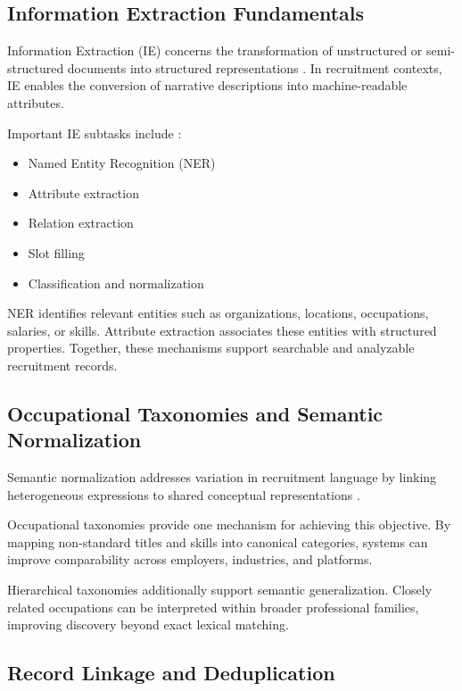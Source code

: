 \subsection{Information Extraction Fundamentals}

Information Extraction (IE) concerns the transformation of unstructured or semi-structured documents into structured representations \cite{jurafsky2023speech}. In recruitment contexts, IE enables the conversion of narrative descriptions into machine-readable attributes.

Important IE subtasks include \cite{sarawagi2008information, grishman2015information}:

\begin{itemize}
\item Named Entity Recognition (NER)
\item Attribute extraction
\item Relation extraction
\item Slot filling
\item Classification and normalization
\end{itemize}

NER identifies relevant entities such as organizations, locations, occupations, salaries, or skills. Attribute extraction associates these entities with structured properties. Together, these mechanisms support searchable and analyzable recruitment records.

\subsection{Occupational Taxonomies and Semantic Normalization}

Semantic normalization addresses variation in recruitment language by linking heterogeneous expressions to shared conceptual representations \cite{staab2009handbook}.

Occupational taxonomies provide one mechanism for achieving this objective. By mapping non-standard titles and skills into canonical categories, systems can improve comparability across employers, industries, and platforms.

Hierarchical taxonomies additionally support semantic generalization. Closely related occupations can be interpreted within broader professional families, improving discovery beyond exact lexical matching.

\subsection{Record Linkage and Deduplication}

